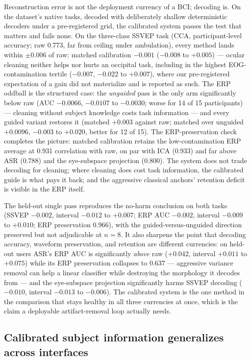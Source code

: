 Reconstruction error is not the deployment currency of a BCI; decoding is. On the dataset's native tasks, decoded with deliberately shallow deterministic decoders under a pre-registered grid, the calibrated system passes the test that matters and fails none. On the three-class SSVEP task (CCA, participant-level accuracy; raw 0.773, far from ceiling under ambulation), every method lands within $\pm 0.006$ of raw: matched calibration $-0.001$ ($-0.008$ to $+0.005$) --- ocular cleaning neither helps nor hurts an occipital task, including in the highest EOG-contamination tertile ($-0.007$, $-0.022$ to $+0.007$), where our pre-registered expectation of a gain did not materialize and is reported as such. The ERP oddball is the structured case: the \emph{unguided} pass is the only arm significantly below raw (AUC $-0.0066$, $-0.0107$ to $-0.0030$; worse for 14 of 15 participants) --- cleaning without subject knowledge costs task information --- and every guided variant restores it (matched $+0.003$ against raw; matched over unguided $+0.0096$, $-0.003$ to $+0.020$, better for 12 of 15). The ERP-preservation check completes the picture: matched calibration retains the low-contamination ERP average at 0.931 correlation with raw, on par with ICA (0.933) and far above ASR (0.788) and the eye-subspace projection (0.800). The system does not trade decoding for cleaning; where cleaning does cost task information, the calibrated guide is what pays it back; and the aggressive classical anchors' retention deficit is visible in the ERP itself.

The held-out single pass reproduces the no-harm conclusion on both tasks (SSVEP $-0.002$, interval $-0.012$ to $+0.007$; ERP AUC $-0.002$, interval $-0.009$ to $+0.010$; ERP preservation 0.966), with the guided-versus-unguided direction preserved but not adjudicable at $n=8$. It also sharpens the point that decoding accuracy, waveform preservation, and retention are different currencies: on held-out users ASR's ERP AUC is significantly \emph{above} raw ($+0.042$, interval $+0.011$ to $+0.075$) while its ERP preservation collapses to 0.637 --- aggressive variance removal can help a linear classifier while destroying the morphology it decodes from --- and the eye-subspace projection significantly harms SSVEP decoding ($-0.010$, interval $-0.013$ to $-0.006$). The calibrated system is the one method in the comparison that stays healthy in all three currencies at once, which is the claim a deployable artifact-removal loop actually needs.

\subsection{Calibrated subject information generalizes across interfaces}
\label{sec:res-representation}


